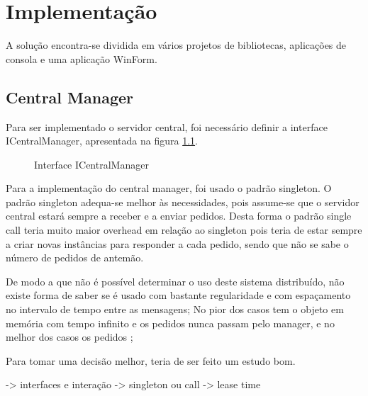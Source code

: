 \chapter{Implementação}

A solução encontra-se dividida em vários projetos de bibliotecas, aplicações de consola e uma aplicação WinForm. 

\section{Central Manager} \label{seccentralmanager}

Para ser implementado o servidor central, foi necessário definir a interface ICentralManager, apresentada na figura \ref{icentralmanager}.\\ 

\begin{figure}[h]
	\caption{Interface ICentralManager}
	\label{icentralmanager}
\end{figure}

Para a implementação do central manager, foi usado o padrão singleton. O padrão singleton adequa-se melhor às necessidades, pois assume-se que o servidor central estará sempre a receber e a enviar pedidos. Desta forma o padrão single call teria muito maior overhead em relação ao singleton pois teria de estar sempre a criar novas instâncias para responder a cada pedido, sendo que não se sabe o número de pedidos de antemão.

De modo a que não é possível determinar o uso deste sistema distribuído, não existe forma de saber se é usado com bastante regularidade e com espaçamento no intervalo de tempo entre as mensagens; No pior dos casos tem o objeto em memória com tempo infinito e os pedidos nunca passam pelo manager, e no melhor dos casos os pedidos ;

Para tomar uma decisão melhor, teria de ser feito um estudo bom.


-> interfaces e interação
-> singleton ou call 
-> lease time